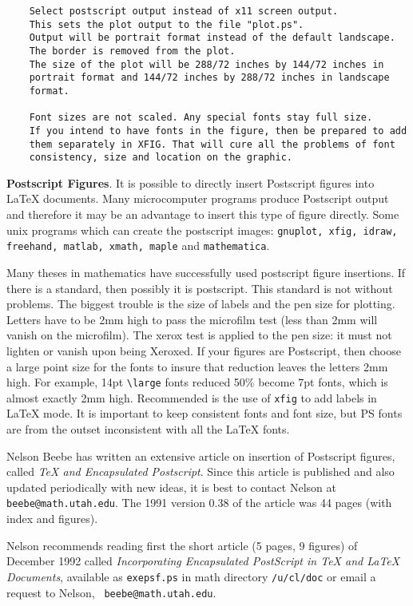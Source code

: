 \begin{verbatim}
    Select postscript output instead of x11 screen output.
    This sets the plot output to the file "plot.ps".
    Output will be portrait format instead of the default landscape.
    The border is removed from the plot.
    The size of the plot will be 288/72 inches by 144/72 inches in
    portrait format and 144/72 inches by 288/72 inches in landscape
    format.

    Font sizes are not scaled. Any special fonts stay full size.
    If you intend to have fonts in the figure, then be prepared to add
    them separately in XFIG. That will cure all the problems of font
    consistency, size and location on the graphic.

\end{verbatim}


{\bf Postscript Figures}. It is possible to directly insert Postscript
figures into \LaTeX{} documents. Many microcomputer programs produce
Postscript output and therefore it may be an advantage to insert this
type of figure directly. Some unix programs which can create the
postscript images: {\tt gnuplot, xfig, idraw, freehand, matlab, xmath,
maple} and {\tt mathematica}.

Many theses in mathematics have successfully used postscript figure
insertions. If there is a standard, then possibly it is postscript. This
standard is not without problems. The biggest trouble is the size of
labels and the pen size for plotting. Letters have to be 2mm high to
pass the microfilm test (less than 2mm will vanish on the microfilm).
The xerox test is applied to the pen size: it must not lighten or vanish
upon being Xeroxed. If your figures are Postscript, then choose a large
point size for the fonts to insure that reduction leaves the letters 2mm
high. For example, 14pt \verb"\large" fonts reduced 50\% become 7pt
fonts, which is almost exactly 2mm high. Recommended is the use of {\tt xfig}
to add labels in \LaTeX{} mode. It is important to keep consistent fonts
and font size, but PS fonts are from the outset inconsistent with all
the \LaTeX{} fonts.

Nelson Beebe has written an extensive article on insertion of Postscript
figures, called {\em \TeX{} and Encapsulated Postscript}. Since this
article is published and also updated periodically with new ideas, it is
best to contact Nelson at {\tt beebe@math.utah.edu}. The 1991 version
0.38 of the article was 44 pages (with index and figures).

Nelson recommends reading first the short article (5 pages, 9 figures)
of December 1992 called {\em Incorporating Encapsulated PostScript in
\TeX{} and \LaTeX{} Documents}, available as {\tt exepsf.ps} in math
directory {\tt /u/cl/doc} or email a request to Nelson, {\tt
beebe@math.utah.edu}.

